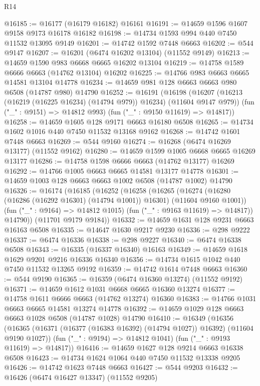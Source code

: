 \begin{lexlean}{R14}
\begin{coremodule}
@16185 := @16177 (@16179 @16182) @16161
@16191 := @14659 @1596 @1607 @9158 @9173 @16178 @16182
@16198 := @14734 @1593 @994 @440 @7450 @11532 @13095 @9149
@16201 := @14742 @1592 @7448 @6663
@16202 := @544 @9147
@16207 := @16201 (@6474 @16202 @13104) (@11552 @9149)
@16213 := @14659 @1590 @983 @6668 @6665 @16202 @13104
@16219 := @14758 @1589 @6666 @6663 (@14762 @13104) @16202
@16225 := @14766 @983 @6663 @6665 @14581 @13104 @14778
@16234 := @14659 @981 @128 @6663 @6663 @980 @6508 (@14787 @980) @14790
@16252 := @16191
    (@16198
      (@16207 (@16213 (@16219 (@16225 @16234) (@14794 @979)) @16234) (@11604 @9147 @979))
      (fun ("_" : @9151) => @14812 @993)
      (fun ("_" : @9150 @11619) => @14817))
@16258 := @14659 @1605 @128 @9171 @6663 @16180 @6508
@16265 := @14734 @1602 @1016 @440 @7450 @11532 @13168 @9162
@16268 := @14742 @1601 @7448 @6663
@16269 := @544 @9160
@16274 := @16268 (@6474 @16269 @13177) (@11552 @9162)
@16280 := @14659 @1599 @1005 @6668 @6665 @16269 @13177
@16286 := @14758 @1598 @6666 @6663 (@14762 @13177) @16269
@16292 := @14766 @1005 @6663 @6665 @14581 @13177 @14778
@16301 := @14659 @1003 @128 @6663 @6663 @1002 @6508 (@14787 @1002) @14790
@16326 := @16174
    (@16185
      (@16252
        (@16258
          (@16265
            (@16274 (@16280 (@16286 (@16292 @16301) (@14794 @1001)) @16301) (@11604 @9160 @1001))
            (fun ("_" : @9164) => @14812 @1015)
            (fun ("_" : @9163 @11619) => @14817))
          @14790))
      (@11701 @9179 @9184))
@16332 := @14659 @1631 @128 @9231 @6663 @16163 @6508
@16335 := @14647 @1630 @9217 @9230
@16336 := @298 @9222
@16337 := @6474 @16336
@16338 := @298 @9227
@16340 := @6474 @16338 @6508
@16343 := @16335 (@16337 @16340) @16163
@16349 := @14659 @1618 @1629 @9201 @9216 @16336 @16340
@16356 := @14734 @1615 @1042 @440 @7450 @11532 @13265 @9192
@16359 := @14742 @1614 @7448 @6663
@16360 := @544 @9190
@16365 := @16359 (@6474 @16360 @13274) (@11552 @9192)
@16371 := @14659 @1612 @1031 @6668 @6665 @16360 @13274
@16377 := @14758 @1611 @6666 @6663 (@14762 @13274) @16360
@16383 := @14766 @1031 @6663 @6665 @14581 @13274 @14778
@16392 := @14659 @1029 @128 @6663 @6663 @1028 @6508 (@14787 @1028) @14790
@16410 := @16349
    (@16356
      (@16365 (@16371 (@16377 (@16383 @16392) (@14794 @1027)) @16392) (@11604 @9190 @1027))
      (fun ("_" : @9194) => @14812 @1041)
      (fun ("_" : @9193 @11619) => @14817))
@16416 := @14659 @1627 @128 @9214 @6663 @16338 @6508
@16423 := @14734 @1624 @1064 @440 @7450 @11532 @13338 @9205
@16426 := @14742 @1623 @7448 @6663
@16427 := @544 @9203
@16432 := @16426 (@6474 @16427 @13347) (@11552 @9205)

\end{coremodule}
\end{lexlean}
